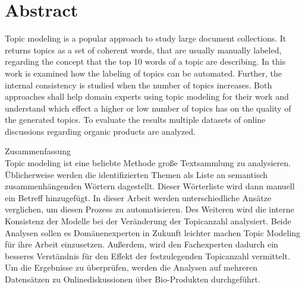 %
\chapter*{Abstract}
\label{sec:abstract}
\vspace*{-10mm}

Topic modeling is a popular approach to study large document collections. It returns topics as a set of coherent words, that are usually manually labeled, regarding the concept that the top 10 words of a topic are describing. In this work is examined how the labeling of topics can be automated. Further, the internal consistency  is studied when the number of topics increases. Both approaches shall help domain experts using topic modeling for their work and understand which effect a higher or low number of topics has on the quality of the generated topics. To evaluate the results multiple datasets of online discussions regarding organic products are analyzed.

\vspace*{20mm}

{ Zusammenfassung}\label{sec:abstract-diff} \\

Topic modeling ist eine beliebte Methode große Textsammlung zu analysieren. Üblicherweise werden die identifizierten Themen als Liste an semantisch zusammenhängenden Wörtern dagestellt. Dieser Wörterliste wird dann manuell ein Betreff hinzugefügt. In dieser Arbeit werden unterschiedliche Ansätze verglichen, um diesen Prozess zu automatisieren. Des Weiteren wird die interne Konsistenz der Modelle bei der Veränderung der Topicanzahl analysiert. Beide Analysen sollen es Domänenexperten in Zukunft leichter machen Topic Modeling für ihre Arbeit einzusetzen. Außerdem, wird den Fachexperten dadurch ein besseres Verständnis für den Effekt der festzulegenden Topicanzahl vermittelt. Um die Ergebnisse zu überprüfen, werden die Analysen auf mehreren Datensätzen zu Onlinediskussionen über Bio-Produkten durchgeführt.
\newpage
